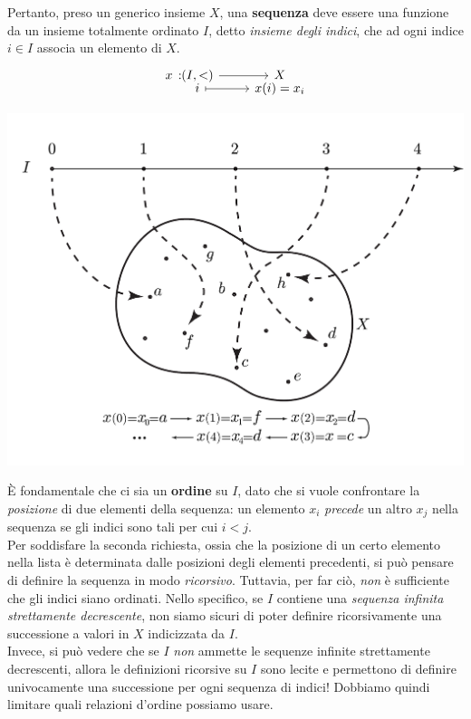Pertanto, preso un generico insieme $X$, una \textbf{sequenza} deve essere una funzione da un insieme totalmente ordinato $I$, detto \textit{insieme degli indici}, che ad ogni indice $i\in I$ associa un elemento di $X$.
\begin{equation*}
	\funztot{x}{\left(I,<\right)}{X}{i}{x(i)=x_i}
\end{equation*}
\begin{center}
		\includegraphics[trim=0cm 0cm 0cm 0cm, clip, scale=0.45]{images/settheorygrafico1.pdf}
\end{center}
È fondamentale che ci sia un \textbf{ordine} su $I$, dato che si vuole confrontare la \textit{posizione} di due elementi della sequenza: un elemento $x_i$ \textit{precede} un altro $x_j$ nella sequenza se gli indici sono tali per cui $i<j$.\\
Per soddisfare la seconda richiesta, ossia che la posizione di un certo elemento nella lista è determinata dalle posizioni degli elementi precedenti, si può pensare di definire la sequenza in modo \textit{ricorsivo}.
Tuttavia, per far ciò, \textit{non} è sufficiente che gli indici siano ordinati. Nello specifico, se $I$ contiene una \textit{sequenza infinita strettamente decrescente}, non siamo sicuri di poter definire ricorsivamente una successione a valori in $X$ indicizzata da $I$.\\
Invece, si può vedere che se $I$ \textit{non} ammette le sequenze infinite strettamente decrescenti, allora le definizioni ricorsive su $I$ sono lecite e permettono di definire univocamente una successione per ogni sequenza di indici! Dobbiamo quindi limitare quali relazioni d'ordine possiamo usare.
